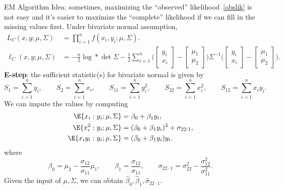 \begin{Example}{EM Algorithm}
    Idea: sometimes, maximizing the ``observed'' likelihood~\ref{obslik}
    is not easy and it's easier to maximize the ``complete''
    likelihood if we can fill in the missing values first. Under bivariate normal
    assumption,
    \begin{align*}
        L_C(x,y;\mu,\Sigma)
         & =\prod_{i=1}^n f(x_i,y_i;\mu,\Sigma). \\
        \ell_C(x,y;\mu,\Sigma)
         & =-\frac{n}{2}\log*{\det{\Sigma}}
        -\frac{1}{2}
        \sum_{i=1}^{n}\biggl(\begin{bmatrix}
                                     y_i \\
                                     x_i
                                 \end{bmatrix}-\begin{bmatrix}
                                                   \mu_1 \\
                                                   \mu_2
                                               \end{bmatrix}\biggr)
        \Sigma^{-1}
        \biggl(\begin{bmatrix}
                       y_i \\
                       x_i
                   \end{bmatrix}-
        \begin{bmatrix}
                \mu_1 \\
                \mu_2
            \end{bmatrix}\biggr).
    \end{align*}
    \textbf{E-step}: the sufficient statistic(s) for bivariate normal is given by
    \[ S_1=\sum_{i=1}^{n}y_i,\qquad S_2=\sum_{i=1}^{n}x_i,
        \qquad S_{11}=\sum_{i=1}^{n}y_i^2,\qquad
        S_{22}=\sum_{i=1}^{n}x_i^2,\qquad
        S_{12}=\sum_{i=1}^{n}x_i y_i. \]
    We can impute the values by computing
    \begin{align*}
        \E{x_i\given y_i;\mu,\Sigma}
         & =\beta_0+\beta_1 y_i,      \\
        \E{x_i^2\given y_i;\mu,\Sigma}
         & =(\beta_0+\beta_1 y_i)^2+
        \sigma_{22\cdot 1},           \\
        \E{x_i y_i\given y_i;\mu,\Sigma}
         & =(\beta_0+\beta_1 y_i)y_i.
    \end{align*}
    where
    \[ \beta_0=\mu_2-\frac{\sigma_{12}}{\sigma_{11}}\mu_1,\qquad
        \beta_1=\frac{\sigma_{12}}{\sigma_{11}},\qquad
        \sigma_{22\cdot 1}=\sigma_{22}^2-\frac{\sigma_{12}^2}{\sigma_{11}^2}. \]
    Given the input of $ \mu,\Sigma $, we can obtain $ \hat{\beta}_0,\hat{\beta}_1,\hat{\sigma}_{22\cdot 1} $.


\end{Example}
